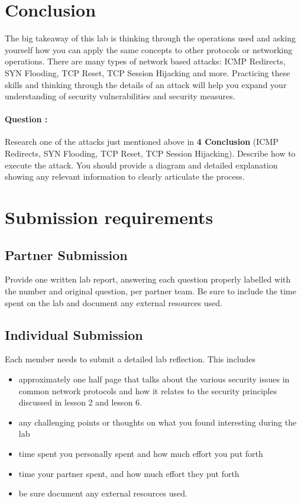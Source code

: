 \documentclass{article}
\begin{document}
\section{Conclusion} The big takeaway of this lab is thinking through the operations used and asking yourself how you can apply the same concepts to other protocols or networking operations. There are many types of network based attacks: ICMP Redirects, SYN Flooding, TCP Reset, TCP Session Hijacking and more. Practicing these skills and thinking through the details of an attack will help you expand your understanding of security vulnerabilities and security measures.

\paragraph{\textbf{Question :}} Research one of the attacks just mentioned above in \textbf{4 Conclusion} (ICMP Redirects, SYN Flooding, TCP Reset, TCP Session Hijacking). Describe how to execute the attack. You should provide a diagram and detailed explanation showing any relevant information to clearly articulate the process.
\addtocounter{Question}{1}


\section{Submission requirements}
\subsection{Partner Submission}
Provide one written lab report, answering each question properly labelled with the number and original question, per partner team. Be sure to include the time spent on the lab and document any external resources used. 

\subsection{Individual Submission}
Each member needs to submit a detailed lab reflection. This includes 
\begin{itemize}
\item approximately one half page that talks about the various security issues in common network protocols and how it relates to the security principles discussed in lesson 2 and lesson 6. 
\item any challenging points or thoughts on what you found interesting during the lab 
\item time spent you personally spent and how much effort you put forth
\item time your partner spent, and how much effort they put forth
\item be sure document any external resources used. 
\end{itemize}
\end{document}
